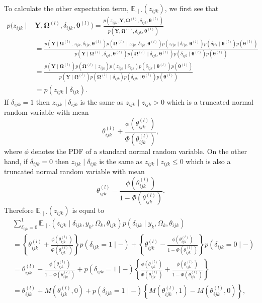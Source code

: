 \documentclass[a4paper, 11pt, oneside]{report}
\newcommand{\E}{\mathbb{E}}
\newcommand{\1}{\mathds{1}}
\newcommand{\powl}{^{(l)}}
\newcommand{\bOmega}{\mathbf{\Omega}}
\newcommand{\btheta}{\mathbf{\theta}}
\newcommand{\tijkl}{\theta_{ijk}\powl}
\newcommand{\bY}{\mathbf{Y}}
\begin{document}
To calculate the other expectation term, $\E_{\cdot \mid \cdot}(z_{ijk})$, we
first see that
\begin{align*}
	p(z_{ijk} \mid & \bY, \bOmega\powl, \delta_{ijk}, \btheta\powl) =
	\frac{p(z_{ijk}, \bY, \bOmega\powl, \delta_{ijk}, \btheta\powl)}{p(\bY, \bOmega\powl, \delta_{ijk}, \btheta\powl)}                                                                                                                                                                                                                                                                                    \\
	               & = \frac{p(\bY \mid \bOmega\powl, z_{ijk}, \delta_{ijk}, \btheta\powl) p(\bOmega\powl \mid z_{ijk}, \delta_{ijk}, \btheta\powl) p(z_{ijk} \mid \delta_{ijk}, \btheta\powl) p(\delta_{ijk} \mid \btheta\powl) p(\btheta\powl)}{p(\bY \mid \bOmega\powl, \delta_{ijk}, \btheta\powl) p(\bOmega\powl \mid \delta_{ijk}, \btheta\powl) p(\delta_{ijk} \mid \btheta\powl) p(\btheta\powl)} \\
	               & = \frac{p(\bY \mid \bOmega\powl) p(\bOmega\powl \mid z_{ijk}) p(z_{ijk} \mid \delta_{ijk}) p(\delta_{ijk} \mid \btheta\powl) p(\btheta\powl)}{p(\bY \mid \bOmega\powl) p(\bOmega\powl \mid \delta_{ijk}) p(\delta_{ijk} \mid \btheta\powl) p(\btheta\powl)}                                                                                                                          \\
	               & = p(z_{ijk} \mid \delta_{ijk}).
\end{align*}
If $\delta_{ijk} = 1$ then $z_{ijk} \mid \delta_{ijk}$ is the same as $z_{ijk}
	\mid z_{ijk} > 0$ which is a truncated normal random variable with mean
\[\theta_{ijk}\powl + \frac{\phi(\theta_{ijk}\powl)}{\Phi(\theta_{ijk}\powl)},\]
where $\phi$ denotes the PDF of a standard normal random variable.
On the other hand, if $\delta_{ijk} = 0$ then $z_{ijk} \mid \delta_{ijk}$ is the
same as $z_{ijk} \mid z_{ijk} \leq 0$ which is also a truncated normal random
variable with mean
\[
	\theta_{ijk}\powl - \frac{\phi(\theta_{ijk}\powl)}{1 - \Phi(\theta_{ijk}\powl)}.
\]
Therefore $\E_{\cdot \mid \cdot}(z_{ijk})$ is equal to
\begin{align*}
	 & \sum_{\delta_{ijk} = 0}^1 \E_{\cdot \mid
		\cdot}\left(z_{ijk} \mid \delta_{ijk}, y_k, \Omega_k, \theta_{ijk}\right)
	p(\delta_{ijk} \mid y_k, \Omega_k, \theta_{ijk})                               \\
	 & = \left\{\tijkl +
	\frac{\phi(\tijkl)}{\Phi(\tijkl)}\right\}
	p(\delta_{ijk} = 1 \mid -) + \left\{\theta_{ijk}\powl -
	\frac{\phi(\theta_{ijk}\powl)}{1 -
	\Phi(\theta_{ijk}\powl)}\right\}p(\delta_{ijk} = 0 \mid -) \label{eq:expect-z} \\
	 & = \tijkl - \frac{\phi(\tijkl)}{1 - \Phi(\tijkl)} + p(\delta_{ijk} = 1
	\mid -) \left\{\frac{\phi(\tijkl)}{\Phi(\tijkl)} + \frac{\phi(\tijkl)}{1
	- \Phi(\tijkl)}\right\}                                                        \\
	 & = \tijkl + M\left(\tijkl, 0\right) + p(\delta_{ijk} = 1 \mid
	-)\left\{M\left(\tijkl, 1\right) -
	M\left(\tijkl, 0\right)\right\},
\end{align*}
\end{document}
